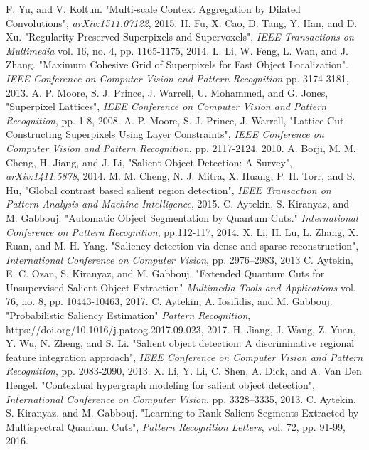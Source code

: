 \documentclass[a4paper,conference]{IEEEtran}
\begin{document}
\begin{thebibliography}{1}
F. Yu, and V. Koltun. "Multi-scale Context Aggregation by Dilated Convolutions", \emph{ 	arXiv:1511.07122}, 2015.
H. Fu, X. Cao, D. Tang, Y. Han, and D. Xu. "Regularity Preserved Superpixels and Supervoxels", \emph{IEEE Transactions on Multimedia} vol. 16, no. 4, pp. 1165-1175, 2014.
L. Li, W. Feng, L. Wan, and J. Zhang. "Maximum Cohesive Grid of Superpixels for Fast Object Localization". \emph{IEEE Conference on Computer Vision and Pattern Recognition} pp. 3174-3181, 2013.
A. P. Moore, S. J. Prince, J. Warrell, U. Mohammed, and G. Jones, "Superpixel Lattices", \emph{IEEE Conference on Computer Vision and Pattern Recognition}, pp. 1-8, 2008.
A. P. Moore, S. J. Prince, J. Warrell, "Lattice Cut-Constructing Superpixels Using Layer Constraints", \emph{IEEE Conference on Computer Vision and Pattern Recognition}, pp. 2117-2124, 2010.
A. Borji, M. M. Cheng, H. Jiang, and J. Li, "Salient Object Detection: A Survey", \emph{arXiv:1411.5878}, 2014.
M. M. Cheng, N. J. Mitra, X. Huang, P. H. Torr, and S. Hu, "Global contrast based salient region detection", \emph{IEEE Transaction on Pattern Analysis and Machine Intelligence}, 2015.
C. Aytekin, S. Kiranyaz, and M. Gabbouj. "Automatic Object Segmentation by Quantum Cuts." \emph{International Conference on Pattern Recognition}, pp.112-117, 2014.
X. Li, H. Lu, L. Zhang, X. Ruan, and M.-H. Yang. "Saliency detection via dense and sparse reconstruction", \emph{International Conference on Computer Vision}, pp. 2976–2983, 2013
C. Aytekin, E. C. Ozan, S. Kiranyaz, and M. Gabbouj. "Extended Quantum Cuts for Unsupervised Salient Object Extraction" \emph{Multimedia Tools and Applications} vol. 76, no. 8, pp. 10443-10463, 2017.
C. Aytekin, A. Iosifidis, and M. Gabbouj. "Probabilistic Saliency Estimation" \emph{Pattern Recognition}, https://doi.org/10.1016/j.patcog.2017.09.023, 2017.
H. Jiang, J. Wang, Z. Yuan, Y. Wu, N. Zheng, and S. Li. "Salient object detection: A discriminative regional feature integration approach", \emph{IEEE Conference on Computer Vision and Pattern Recognition}, pp. 2083-2090, 2013.
X. Li, Y. Li, C. Shen, A. Dick, and A. Van Den Hengel. "Contextual hypergraph modeling for salient object detection", \emph{International Conference on Computer Vision}, pp. 3328–3335, 2013.
C. Aytekin, S. Kiranyaz, and M. Gabbouj. "Learning to Rank Salient Segments Extracted by Multispectral Quantum Cuts", \emph{Pattern Recognition Letters}, vol. 72, pp. 91-99, 2016.

\end{thebibliography}
\end{document}
